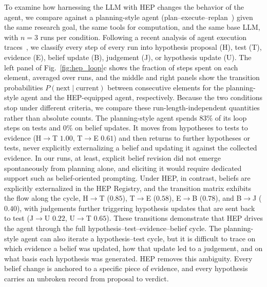 To examine how harnessing the LLM with HEP changes the behavior of the
agent, we compare against a planning-style agent
(plan--execute--replan~\cite{Yao2023ReAct,Sun2023AdaPlanner,Shinn2023Reflexion})
given the same research goal, the same tools for computation, and the
same base LLM, with $n=3$ runs per condition.
Following a recent analysis of agent execution
traces~\cite{RiosGarcia2026AIScientists}, we classify every step of
every run into hypothesis proposal (H), test (T), evidence (E), belief update
(B), judgement (J), or hypothesis update (U).
The left panel of Fig.~\ref{fig:hep_loop}c shows the fraction of steps
spent on each element, averaged over runs, and the middle and right
panels show the transition probabilities
$P(\text{next} \mid \text{current})$ between consecutive elements for
the planning-style agent and the HEP-equipped agent, respectively.
Because the two conditions stop under different criteria, we compare
these run-length-independent quantities rather than absolute counts.
The planning-style agent spends $83\%$ of its loop steps on tests and
$0\%$ on belief updates.
It moves from hypotheses to tests to evidence
(H$\rightarrow$T $1.00$, T$\rightarrow$E $0.61$) and then returns to
further hypotheses or tests, never explicitly externalizing a belief
and updating it against the collected evidence.
In our runs, at least, explicit belief revision did not emerge
spontaneously from planning alone, and eliciting it would require
dedicated support such as belief-oriented prompting.
Under HEP, in contrast, beliefs are explicitly externalized in the HEP
Registry, and the transition matrix exhibits the flow along the cycle,
H$\rightarrow$T ($0.85$), T$\rightarrow$E ($0.58$), E$\rightarrow$B
($0.78$), and B$\rightarrow$J ($0.40$), with judgements further
triggering hypothesis updates that are sent back to test
(J$\rightarrow$U $0.22$, U$\rightarrow$T $0.65$).
These transitions demonstrate that HEP drives the agent through the
full hypothesis--test--evidence--belief cycle.
The planning-style agent can also iterate a hypothesis--test cycle, but
it is difficult to trace on which evidence a belief was updated, how
that update led to a judgement, and on what basis each hypothesis was
generated.
HEP removes this ambiguity.
Every belief change is anchored to a specific piece of evidence, and
every hypothesis carries an unbroken record from proposal to verdict.

\FloatBarrier

